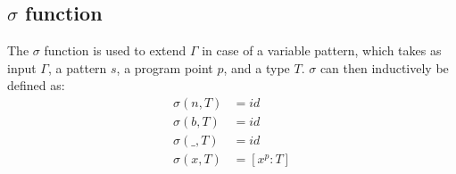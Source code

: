 \documentclass[../../master.tex]{subfiles}
\begin{document}
\subsection{$\sigma$ function}
The $\sigma$ function is used to extend $\Gamma$ in case of a variable pattern, which takes as input $\Gamma$, a pattern $s$, a program point $p$, and a type $T$.
$\sigma$ can then inductively be defined as:
\begin{align*}
	\sigma(n,T) &= id\\
	\sigma(b,T) &= id\\
	\sigma(\_,T) &= id\\
	\sigma(x,T) &= [x^p:T]
\end{align*}
\end{document}
